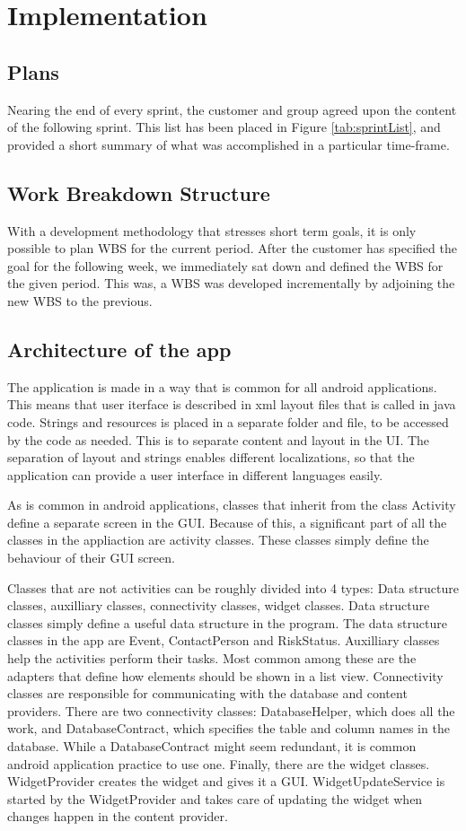 \chapter{Implementation}
\section{Plans}

Nearing the end of every sprint, the customer and group agreed upon the content of the following sprint. This list has been placed in Figure \ref{tab:sprintList}, and provided a short summary of what was accomplished in a particular time-frame. 

\section{Work Breakdown Structure}
With a development methodology that stresses short term goals, it is only possible to plan WBS for the current period. After the customer has specified the goal for the following week, we immediately sat down and defined the WBS for the given period. This was, a WBS was developed incrementally by adjoining the new WBS to the previous.

\section{Architecture of the app}
The application is made in a way that is common for all android applications. This means that user iterface is described in xml layout files that is called in java code. Strings and resources is placed in a separate folder and file, to be accessed by the code as needed. This is to separate content and layout in the UI. The separation of layout and strings enables different localizations, so that the application can provide a user interface in different languages easily.

As is common in android applications, classes that inherit from the class Activity define a separate screen in the GUI. Because of this, a significant part of all the classes in the appliaction are activity classes. These classes simply define the behaviour of their GUI screen.

Classes that are not activities can be roughly divided into 4 types: Data structure classes, auxilliary classes, connectivity classes, widget classes. Data structure classes simply define a useful data structure in the program. The data structure classes in the app are Event, ContactPerson and RiskStatus. Auxilliary classes help the activities perform their tasks. Most common among these are the adapters that define how elements should be shown in a list view. Connectivity classes are responsible for communicating with the database and content providers. There are two connectivity classes: DatabaseHelper, which does all the work, and DatabaseContract, which specifies the table and column names in the database. While a DatabaseContract might seem redundant, it is common android application practice to use one. Finally, there are the widget classes. WidgetProvider creates the widget and gives it a GUI. WidgetUpdateService is started by the WidgetProvider and takes care of updating the widget when changes happen in the content provider.


